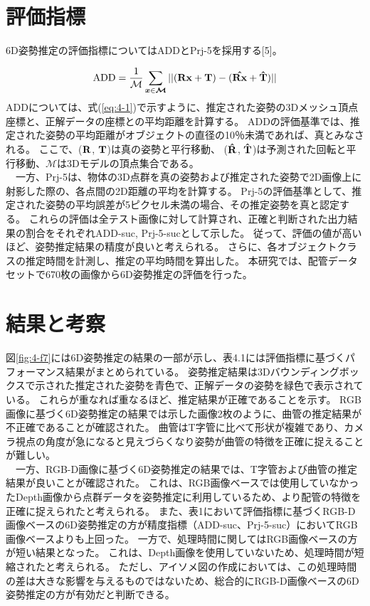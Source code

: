 \section{評価指標}
6D姿勢推定の評価指標についてはADDとPrj-5を採用する[5]。

\begin{equation}
\textrm{ADD} = \frac{1}{\mathcal{M}}\sum_{\boldsymbol{x}\in \boldsymbol{\mathcal{M}}}||(\boldsymbol{\textrm{\textbf{Rx}}} + \boldsymbol{\textrm{\textbf{\textbf{T}}}}) - (\boldsymbol{\hat{\textrm{\textbf{Rx}}}} +  \boldsymbol{\hat{\textrm{\textbf{T}}}})||
\label{eq:4-1}
\end{equation}
ADDについては、式(\ref{eq:4-1})で示すように、推定された姿勢の3Dメッシュ頂点座標と、正解データの座標との平均距離を計算する。
ADDの評価基準では、推定された姿勢の平均距離がオブジェクトの直径の10％未満であれば、真とみなされる。
ここで、($\boldsymbol{\textrm{\textbf{R}}}$, $\boldsymbol{\textrm{\textbf{T}}}$)は真の姿勢と平行移動、 ($\boldsymbol{\hat{\textrm{\textbf{R}}}}$, $\boldsymbol{\hat{\textrm{\textbf{T}}}}$)は予測された回転と平行移動、$\boldsymbol{\mathcal{M}}$は3Dモデルの頂点集合である。\\
　一方、Prj-5は、物体の3D点群を真の姿勢および推定された姿勢で2D画像上に射影した際の、各点間の2D距離の平均を計算する。
Prj-5の評価基準として、推定された姿勢の平均誤差が5ピクセル未満の場合、その推定姿勢を真と認定する。
これらの評価は全テスト画像に対して計算され、正確と判断された出力結果の割合をそれぞれADD-suc, Prj-5-sucとして示した。
従って、評価の値が高いほど、姿勢推定結果の精度が良いと考えられる。
さらに、各オブジェクトクラスの推定時間を計測し、推定の平均時間を算出した。
本研究では、配管データセットで670枚の画像から6D姿勢推定の評価を行った。


\section{結果と考察}
図\ref{fig:4-f7}には6D姿勢推定の結果の一部が示し、表4.1には評価指標に基づくパフォーマンス結果がまとめられている。
姿勢推定結果は3Dバウンディングボックスで示された推定された姿勢を青色で、正解データの姿勢を緑色で表示されている。
これらが重なれば重なるほど、推定結果が正確であることを示す。
RGB画像に基づく6D姿勢推定の結果では示した画像2枚のように、曲管の推定結果が不正確であることが確認された。
曲管はT字管に比べて形状が複雑であり、カメラ視点の角度が急になると見えづらくなり姿勢が曲管の特徴を正確に捉えることが難しい。\\
　一方、RGB-D画像に基づく6D姿勢推定の結果では、T字管および曲管の推定結果が良いことが確認された。
これは、RGB画像ベースでは使用していなかったDepth画像から点群データを姿勢推定に利用しているため、より配管の特徴を正確に捉えられたと考えられる。
また、表1において評価指標に基づくRGB-D画像ベースの6D姿勢推定の方が精度指標（ADD-suc、Prj-5-suc）においてRGB画像ベースよりも上回った。
一方で、処理時間に関してはRGB画像ベースの方が短い結果となった。
これは、Depth画像を使用していないため、処理時間が短縮されたと考えられる。
ただし、アイソメ図の作成においては、この処理時間の差は大きな影響を与えるものではないため、総合的にRGB-D画像ベースの6D姿勢推定の方が有効だと判断できる。

